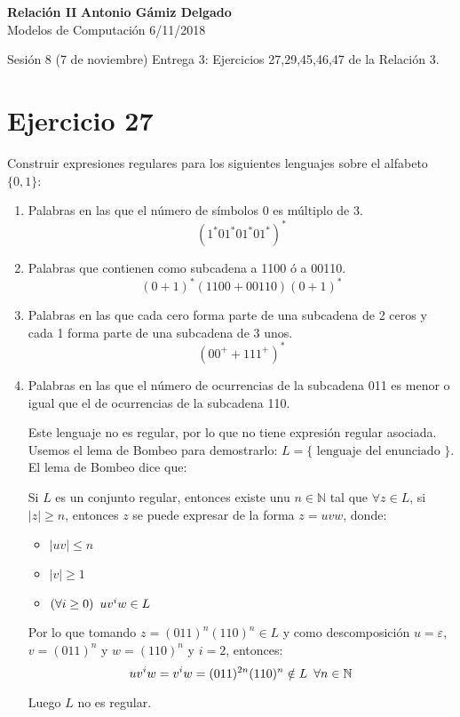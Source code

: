 \documentclass[a4paper, 11pt]{article}
\begin{document}
\noindent
\large\textbf{Relación II} \hfill \textbf{Antonio Gámiz Delgado} \\
\normalsize Modelos de Computación \hfill 6/11/2018

Sesión 8 (7 de noviembre) Entrega 3: Ejercicios 27,29,45,46,47 de la Relación 3.

\section*{Ejercicio 27}
Construir expresiones regulares para los siguientes lenguajes sobre el alfabeto $\{0,1\}$:
\begin{enumerate}
\item Palabras en las que el número de símbolos 0 es múltiplo de 3.
\[
(1^*01^*01^*01^*)^*
\]
\item Palabras que contienen como subcadena a 1100 ó a 00110.
\[
(0+1)^*(1100+00110)(0+1)^*
\]
\item Palabras en las que cada cero forma parte de una subcadena de 2 ceros y cada 1 forma parte de una subcadena de 3 unos.
\[
(00^++111^+)^*
\]
\item Palabras en las que el número de ocurrencias de la subcadena 011 es menor o igual que el de ocurrencias de la subcadena 110.

Este lenguaje no es regular, por lo que no tiene expresión regular asociada. Usemos el lema de Bombeo para demostrarlo: $L=\{\text{ lenguaje del enunciado }\}$.
El lema de Bombeo dice que:

Si $L$ es un conjunto regular, entonces existe unu $n\in\mathbb{N}$ tal que $\forall z \in L$, si $|z|\geq n$, entonces $z$ se puede expresar de la forma $z=uvw$, donde:
\begin{itemize}
\item $|uv|\leq n$
\item $|v|\geq 1$
\item $(\forall i \geq 0) \enskip uv^iw \in L$
\end{itemize}

Por lo que tomando $z = (011)^n(110)^n\in L$ y como descomposición $u=\varepsilon$, $v=(011)^n$ y $w=(110)^n$ y $i=2$, entonces:
\[
uv^iw=v^iw=(011)^{2n}(110)^n\notin L \enskip \forall n \in \mathbb{N}
\]

Luego $L$ no es regular.

\end{enumerate}
\end{document}
